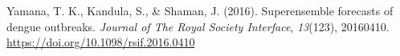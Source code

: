\documentclass[
]{article}
\newlength{\cslhangindent}
\newlength{\cslentryspacingunit} %
\newenvironment{CSLReferences}[2] %
 {%
  \setlength{\parindent}{0pt}
  \ifodd #1
  \let\oldpar\par
  \def\par{\hangindent=\cslhangindent\oldpar}
  \fi
  \setlength{\parskip}{#2\cslentryspacingunit}
 }%
 {}
\begin{document}
\begin{CSLReferences}{1}{0}
\leavevmode{}%
Yamana, T. K., Kandula, S., \& Shaman, J. (2016). Superensemble forecasts of dengue outbreaks. \emph{Journal of The Royal Society Interface}, \emph{13}(123), 20160410. \url{https://doi.org/10.1098/rsif.2016.0410}

\end{CSLReferences}
\end{document}
